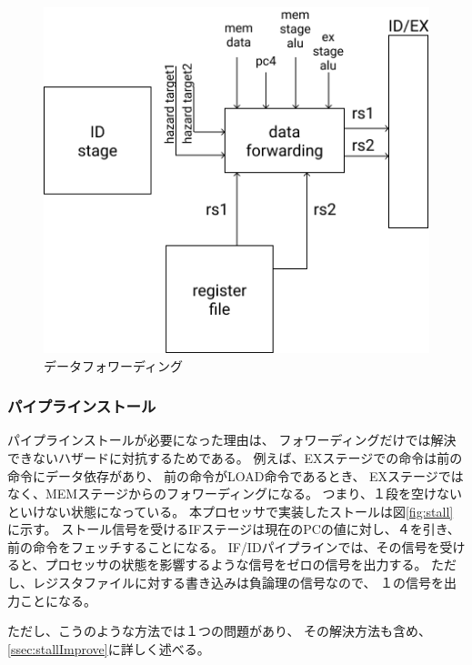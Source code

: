 \documentclass[../main.tex]{subfiles}
\begin{document}
        \begin{figure}[h]
            \centering
            \includegraphics[width = 1.2\columnwidth]{../images/forwarding.png}
            \caption{データフォワーディング}
            \label{fig:forwarding}
        \end{figure}

        \subsubsection{パイプラインストール} \label{sssec:stall}
            パイプラインストールが必要になった理由は、
            フォワーディングだけでは解決できないハザードに対抗するためである。
            例えば、EXステージでの命令は前の命令にデータ依存があり、
            前の命令がLOAD命令であるとき、
            EXステージではなく、MEMステージからのフォワーディングになる。
            つまり、１段を空けないといけない状態になっている。
            本プロセッサで実装したストールは図\ref{fig:stall}に示す。
            ストール信号を受けるIFステージは現在のPCの値に対し、４を引き、
            前の命令をフェッチすることになる。
            IF/IDパイプラインでは、その信号を受けると、プロセッサの状態を影響するような信号をゼロの信号を出力する。
            ただし、レジスタファイルに対する書き込みは負論理の信号なので、
            １の信号を出力ことになる。

            ただし、こうのような方法では１つの問題があり、
            その解決方法も含め、\ref{ssec:stallImprove}に詳しく述べる。
\end{document}
